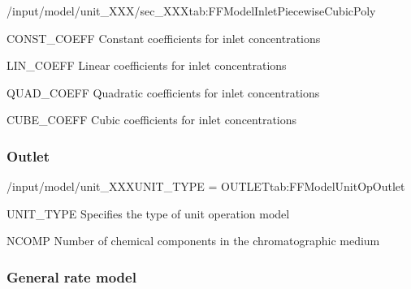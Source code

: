 \begin{groupscope}{/input/model/unit\_XXX/sec\_XXX}{tab:FFModelInletPiecewiseCubicPoly}
  \begin{dataset}[type=double,unit=\si{\mol\per\cubic\metre\of{IV}},range={$\mathds{R}$},length={\texttt{NCOMP}}]{CONST\_COEFF}
    Constant coefficients for inlet concentrations
  \end{dataset}
  \begin{dataset}[type=double,unit=\si{\mol\per\cubic\metre\of{IV}\per\second},range={$\mathds{R}$},length={\texttt{NCOMP}}]{LIN\_COEFF}
    Linear coefficients for inlet concentrations
  \end{dataset}
  \begin{dataset}[type=double,unit=\si{\mol\per\cubic\metre\of{IV}\per\square\second},range={$\mathds{R}$},length={\texttt{NCOMP}}]{QUAD\_COEFF}
    Quadratic coefficients for inlet concentrations
  \end{dataset}
  \begin{dataset}[type=double,unit=\si{\mol\per\cubic\metre\of{IV}\per\cubic\second},range={$\mathds{R}$},length={\texttt{NCOMP}}]{CUBE\_COEFF}
    Cubic coefficients for inlet concentrations
  \end{dataset}
\end{groupscope}

\subsubsection{Outlet}

\begin{condsubgroup}{/input/model/unit\_XXX}{UNIT\_TYPE = OUTLET}{tab:FFModelUnitOpOutlet}
  \begin{dataset}[type=string,range={\texttt{OUTLET}},length=1]{UNIT\_TYPE}
    Specifies the type of unit operation model
  \end{dataset}
  \begin{dataset}[type=int,range={$\geq 1$},length=1]{NCOMP}
    Number of chemical components in the chromatographic medium
  \end{dataset}
\end{condsubgroup}

\subsubsection{General rate model}

